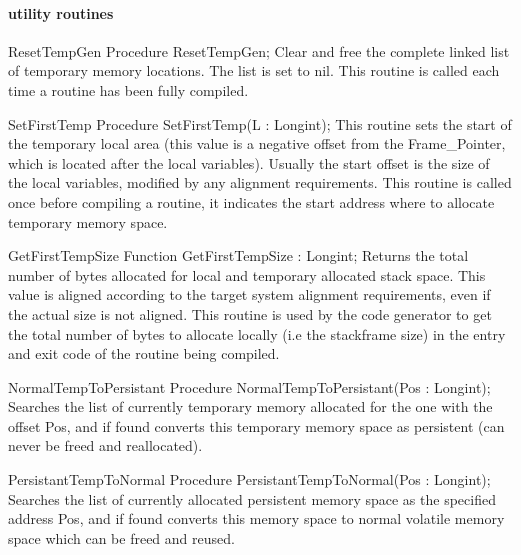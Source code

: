\documentclass [a4paper,12pt]{article}
\begin{document}
\paragraph{utility routines}

\begin{procedure}{ResetTempGen}
\Declaration
Procedure ResetTempGen;
\Description
Clear and free the complete linked list of temporary memory locations. The
list is set to nil.
\Notes
This routine is called each time a routine has been fully compiled.
\end{procedure}

\begin{procedure}{SetFirstTemp}
\Declaration
Procedure SetFirstTemp(L : Longint);
\Description
This routine sets the start of the temporary local area (this value is a
negative offset from the Frame{\_}Pointer, which is located after the local
variables). Usually the start offset is the size of the local variables,
modified by any alignment requirements.
\Notes
This routine is called once before compiling a routine, it indicates the
start address where to allocate temporary memory space.
\end{procedure}

\begin{function}{GetFirstTempSize}
\Declaration
Function GetFirstTempSize : Longint;
\Description
Returns the total number of bytes allocated for local and temporary
allocated stack space. This value is aligned according to the target system
alignment requirements, even if the actual size is not aligned.
\Notes
This routine is used by the code generator to get the total number of bytes
to allocate locally (i.e the stackframe size) in the entry and exit code of
the routine being compiled.
\end{function}

\begin{function}{NormalTempToPersistant}
\Declaration
Procedure NormalTempToPersistant(Pos : Longint);
\Description
Searches the list of currently temporary memory allocated for the one with
the offset \textsf{Pos}, and if found converts this temporary memory space
as persistent (can never be freed and reallocated).
\end{function}

\begin{function}{PersistantTempToNormal}
\Declaration
Procedure PersistantTempToNormal(Pos : Longint);
\Description
Searches the list of currently allocated persistent memory space as the
specified address \textsf{Pos}, and if found converts this memory space to
normal volatile memory space which can be freed and reused.
\end{function}
\end{document}
